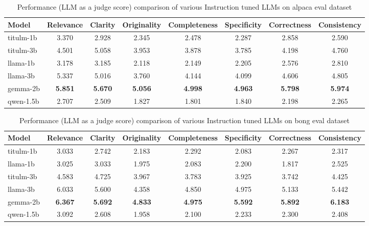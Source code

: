 \begin{table*}[htb!]
    \centering
    \begin{tabular}{lccccccc}
        \toprule
        Model & Relevance & Clarity & Originality & Completeness & Specificity & Correctness & Consistency \\
        \midrule
        titulm-1b  & 3.370  & 2.928  & 2.345  & 2.478  & 2.287  & 2.858  & 2.590  \\
        titulm-3b  & 4.501  & 5.058  & 3.953  & 3.878  & 3.785  & 4.198  & 4.760  \\
        llama-1b   & 3.178  & 3.185  & 2.118  & 2.149  & 2.205  & 2.576  & 2.810  \\
        llama-3b   & 5.337  & 5.016  & 3.760  & 4.144  & 4.099  & 4.606  & 4.805  \\
        gemma-2b   & \textbf{5.851}  & \textbf{5.670}  & \textbf{5.056}  & \textbf{4.998}  & \textbf{4.963}  & \textbf{5.798}  & \textbf{5.974}  \\
        qwen-1.5b  & 2.707  & 2.509  & 1.827  & 1.801  & 1.840  & 2.198  & 2.265  \\
        \bottomrule
    \end{tabular}
    \caption{Performance (LLM as a judge score) comparison of various Instruction tuned LLMs on alpaca eval dataset}
    \label{tab:model_comparison_alpaca}
\end{table*}


\begin{table*}[htb!]
    \centering
    \begin{tabular}{lccccccc}
        \toprule
        Model & Relevance & Clarity & Originality & Completeness & Specificity & Correctness & Consistency \\
        \midrule
        titulm-1b  & 3.033  & 2.742  & 2.183  & 2.292  & 2.083  & 2.267  & 2.317  \\
        llama-1b   & 3.025  & 3.033  & 1.975  & 2.083  & 2.200  & 1.817  & 2.525  \\
        titulm-3b  & 4.583  & 4.725  & 3.967  & 3.783  & 3.925  & 3.742  & 4.425  \\
        llama-3b   & 6.033  & 5.600  & 4.358  & 4.850  & 4.975  & 5.133  & 5.442  \\
        gemma-2b   & \textbf{6.367}  & \textbf{5.692}  & \textbf{4.833}  & \textbf{4.975}  & \textbf{5.592}  & \textbf{5.892}  & \textbf{6.183}  \\
        qwen-1.5b  & 3.092  & 2.608  & 1.958  & 2.100  & 2.233  & 2.300  & 2.408  \\
        \bottomrule
    \end{tabular}
    \caption{Performance (LLM as a judge score) comparison of various Instruction tuned LLMs on bong eval dataset}
    \label{tab:model_comparison_bong}
\end{table*}


